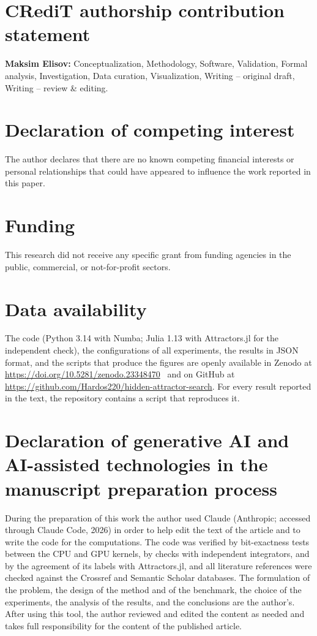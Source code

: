 \section*{CRediT authorship contribution statement}
\textbf{Maksim Elisov:} Conceptualization, Methodology, Software, Validation, Formal analysis, Investigation, Data curation, Visualization, Writing -- original draft, Writing -- review \& editing.

\section*{Declaration of competing interest}
The author declares that there are no known competing financial interests or personal relationships that could have appeared to influence the work reported in this paper.

\section*{Funding}
This research did not receive any specific grant from funding agencies in the public, commercial, or not-for-profit sectors.

\section*{Data availability}
The code (Python 3.14 with Numba; Julia 1.13 with Attractors.jl for the independent check), the configurations of all experiments, the results in JSON format, and the scripts that produce the figures are openly available in Zenodo at \url{https://doi.org/10.5281/zenodo.23348470}~\cite{Elisov2026Code} and on GitHub at \url{https://github.com/Hardos220/hidden-attractor-search}. For every result reported in the text, the repository contains a script that reproduces it.

\section*{Declaration of generative AI and AI-assisted technologies in the manuscript preparation process}
During the preparation of this work the author used Claude (Anthropic; accessed through Claude Code, 2026) in order to help edit the text of the article and to write the code for the computations. The code was verified by bit-exactness tests between the CPU and GPU kernels, by checks with independent integrators, and by the agreement of its labels with Attractors.jl, and all literature references were checked against the Crossref and Semantic Scholar databases. The formulation of the problem, the design of the method and of the benchmark, the choice of the experiments, the analysis of the results, and the conclusions are the author's. After using this tool, the author reviewed and edited the content as needed and takes full responsibility for the content of the published article.
